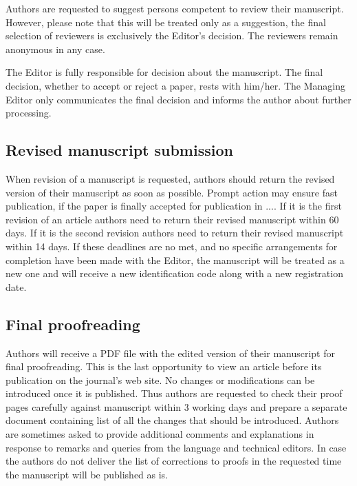 \documentclass[USenglish,oneside,twocolumn]{article}
\begin{document}
Authors are requested to suggest persons competent to review their manuscript. However, please note that this will be treated only as a suggestion, the final selection of reviewers is exclusively the Editor's decision. The reviewers remain anonymous in any case.

The Editor is fully responsible for decision about the manuscript. The final decision, whether to accept or reject a paper, rests with him/her. The Managing Editor only communicates the final decision and informs the author about further processing.

\subsection{Revised manuscript submission}

When revision of a manuscript is requested, authors should return the revised version of their manuscript as soon as possible. Prompt action may ensure fast publication, if the paper is finally accepted for publication in .... If it is the first revision of an article authors need to return their revised manuscript within 60 days. If it is the second revision authors need to return their revised manuscript within 14 days. If these deadlines are no met, and no specific arrangements for completion have been made with the Editor, the manuscript will be treated as a new one and will receive a new identification code along with a new registration date.

\subsection{Final proofreading}

Authors will receive a PDF file with the edited version of their manuscript for final proofreading. This is the last opportunity to view an article before its publication on the journal's web site. No changes or modifications can be introduced once it is published. Thus authors are requested to check their proof pages carefully against manuscript within 3 working days and prepare a separate document containing list of all the changes that should be introduced. Authors are sometimes asked to provide additional comments and explanations in response to remarks and queries from the language and technical editors. In case the authors do not deliver the list of corrections to proofs in the requested time the manuscript will be published as is.
\end{document}
